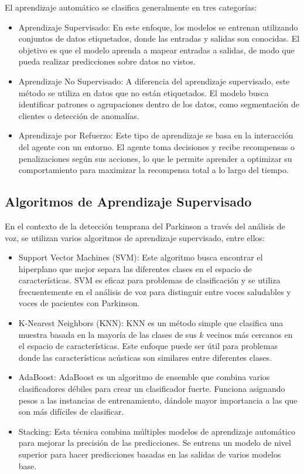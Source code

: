 \documentclass[listof=nochaptergap,12pt,times,authoryear]{report}
\begin{document}
El aprendizaje automático se clasifica generalmente en tres categorías:

\begin{itemize}
    \item Aprendizaje Supervisado: En este enfoque, los modelos se entrenan utilizando conjuntos de datos etiquetados, donde las entradas y salidas son conocidas. El objetivo es que el modelo aprenda a mapear entradas a salidas, de modo que pueda realizar predicciones sobre datos no vistos.

    \item Aprendizaje No Supervisado: A diferencia del aprendizaje supervisado, este método se utiliza en datos que no están etiquetados. El modelo busca identificar patrones o agrupaciones dentro de los datos, como segmentación de clientes o detección de anomalías.

    \item Aprendizaje por Refuerzo: Este tipo de aprendizaje se basa en la interacción del agente con un entorno. El agente toma decisiones y recibe recompensas o penalizaciones según sus acciones, lo que le permite aprender a optimizar su comportamiento para maximizar la recompensa total a lo largo del tiempo.
\end{itemize}

\subsection{Algoritmos de Aprendizaje Supervisado}

En el contexto de la detección temprana del Parkinson a través del análisis de voz, se utilizan varios algoritmos de aprendizaje supervisado, entre ellos:

\begin{itemize}
    \item Support Vector Machines (SVM): Este algoritmo busca encontrar el hiperplano que mejor separa las diferentes clases en el espacio de características. SVM es eficaz para problemas de clasificación y se utiliza frecuentemente en el análisis de voz para distinguir entre voces saludables y voces de pacientes con Parkinson.

    \item K-Nearest Neighbors (KNN): KNN es un método simple que clasifica una muestra basada en la mayoría de las clases de sus \(k\) vecinos más cercanos en el espacio de características. Este enfoque puede ser útil para problemas donde las características acústicas son similares entre diferentes clases.

    \item AdaBoost: AdaBoost es un algoritmo de ensemble que combina varios clasificadores débiles para crear un clasificador fuerte. Funciona asignando pesos a las instancias de entrenamiento, dándole mayor importancia a las que son más difíciles de clasificar.

    \item Stacking: Esta técnica combina múltiples modelos de aprendizaje automático para mejorar la precisión de las predicciones. Se entrena un modelo de nivel superior para hacer predicciones basadas en las salidas de varios modelos base.
\end{itemize}
\end{document}

